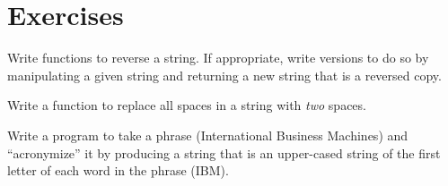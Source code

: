 

\section{Exercises}

\begin{exer}
Write functions to reverse a string.  If appropriate, write versions to do so by manipulating a given
string and returning a new string that is a reversed copy.
\end{exer}

\begin{exer}
Write a function to replace all spaces in a string with \emph{two} spaces.
\end{exer}

\begin{exer}
Write a program to take a phrase (International Business Machines) and ``acronymize'' it by producing
a string that is an upper-cased string of the first letter of each word in the phrase (IBM).
\end{exer}


